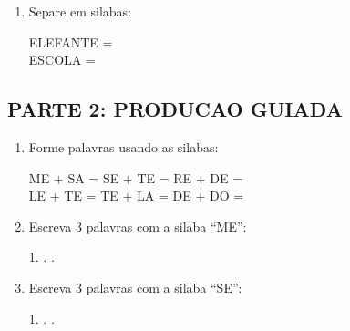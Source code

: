 \begin{exercicio}
\begin{enumerate}
  \item Separe em silabas:
  \begin{center}
  ELEFANTE = \underline{\hspace{1cm}} \underline{\hspace{1cm}} \underline{\hspace{1cm}} \underline{\hspace{1cm}}\\
  ESCOLA = \underline{\hspace{1cm}} \underline{\hspace{1cm}} \underline{\hspace{1cm}}
  \end{center}
\end{enumerate}

\subsection*{PARTE 2: PRODUCAO GUIADA}

\begin{enumerate}[resume]
  \item Forme palavras usando as silabas:
  \begin{center}
  ME + SA = \underline{\hspace{2cm}} \quad SE + TE = \underline{\hspace{2cm}} \quad RE + DE = \underline{\hspace{2cm}}\\[0.5em]
  LE + TE = \underline{\hspace{2cm}} \quad TE + LA = \underline{\hspace{2cm}} \quad DE + DO = \underline{\hspace{2cm}}
  \end{center}

  \item Escreva 3 palavras com a silaba ``ME'':
  \begin{center}
  1. \underline{\hspace{3cm}} . \underline{\hspace{3cm}} . \underline{\hspace{3cm}}
  \end{center}

  \item Escreva 3 palavras com a silaba ``SE'':
  \begin{center}
  1. \underline{\hspace{3cm}} . \underline{\hspace{3cm}} . \underline{\hspace{3cm}}
  \end{center}


\end{enumerate}
\end{exercicio}
